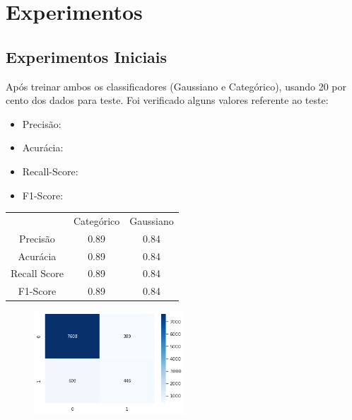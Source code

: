 \documentclass[conference]{IEEEtran}
\begin{document}
\section{Experimentos}

\subsection{Experimentos Iniciais}
Após treinar ambos os classificadores (Gaussiano e Categórico), usando 20 por cento dos dados para teste. Foi verificado alguns valores referente ao teste:

\begin{itemize}
\item Precisão:
\item Acurácia:
\item Recall-Score:
\item F1-Score:
\end{itemize}
\begin{table}[H]
	\centering
    \begin{small}
        \begin{tabular}{ccc}
        	\\
        	\\
            \hline
                                    & Categórico       & Gaussiano\\
            \hline
            Precisão                & 0.89             & 0.84\\
            Acurácia                & 0.89             & 0.84\\
            Recall Score            & 0.89             & 0.84\\
            F1-Score                & 0.89             & 0.84\\
            
            \hline
        \end{tabular}
    \end{small}
\end{table}

\begin{figure}[H]
\centerline{\includegraphics[width=0.5\textwidth]{cm-categorico.png}}
\end{figure}
\end{document}
